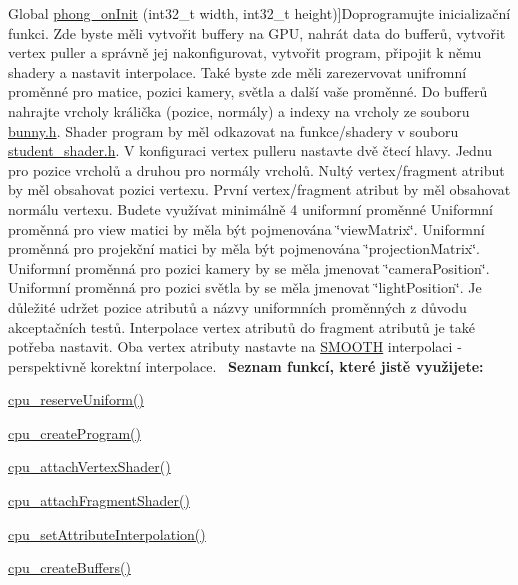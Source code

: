 \begin{DoxyRefList}
Global \hyperlink{group__cpu__side_gac2adb2ba4e748239b9db4d037584d3cc}{phong\+\_\+on\+Init} (int32\+\_\+t width, int32\+\_\+t height)]Doprogramujte inicializační funkci. Zde byste měli vytvořit buffery na G\+PU, nahrát data do bufferů, vytvořit vertex puller a správně jej nakonfigurovat, vytvořit program, připojit k němu shadery a nastavit interpolace. Také byste zde měli zarezervovat unifromní proměnné pro matice, pozici kamery, světla a další vaše proměnné. Do bufferů nahrajte vrcholy králička (pozice, normály) a indexy na vrcholy ze souboru \hyperlink{bunny_8h}{bunny.\+h}. Shader program by měl odkazovat na funkce/shadery v souboru \hyperlink{student__shader_8h}{student\+\_\+shader.\+h}. V konfiguraci vertex pulleru nastavte dvě čtecí hlavy. Jednu pro pozice vrcholů a druhou pro normály vrcholů. Nultý vertex/fragment atribut by měl obsahovat pozici vertexu. První vertex/fragment atribut by měl obsahovat normálu vertexu. Budete využívat minimálně 4 uniformní proměnné Uniformní proměnná pro view matici by měla být pojmenována \char`\"{}view\+Matrix\char`\"{}. Uniformní proměnná pro projekční matici by měla být pojmenována \char`\"{}projection\+Matrix\char`\"{}. Uniformní proměnná pro pozici kamery by se měla jmenovat \char`\"{}camera\+Position\char`\"{}. Uniformní proměnná pro pozici světla by se měla jmenovat \char`\"{}light\+Position\char`\"{}. Je důležité udržet pozice atributů a názvy uniformních proměnných z důvodu akceptačních testů. Interpolace vertex atributů do fragment atributů je také potřeba nastavit. Oba vertex atributy nastavte na \hyperlink{program_8h_a8472f01c511d77bbfb981a46618ea1eaa33c7ccbb848d8fd75455dd9786a1153a}{S\+M\+O\+O\+TH} interpolaci -\/ perspektivně korektní interpolace.~\newline
 {\bfseries Seznam funkcí, které jistě využijete\+:}
\begin{DoxyItemize}
\item \hyperlink{uniforms_8h_acd308bcb7720918cb48f75292a247dfb}{cpu\+\_\+reserve\+Uniform()}
\item \hyperlink{program_8h_a4fca7a0e3dac7f93620a1bde6efcde16}{cpu\+\_\+create\+Program()}
\item \hyperlink{program_8h_aaefc7833a6deea461cc06d00318f7975}{cpu\+\_\+attach\+Vertex\+Shader()}
\item \hyperlink{program_8h_a402ad69a9f1b80b8de408b991e190ed6}{cpu\+\_\+attach\+Fragment\+Shader()}
\item \hyperlink{program_8h_aca1c5019ec58c919160c4c12a5e5fa06}{cpu\+\_\+set\+Attribute\+Interpolation()}
\item \hyperlink{buffer_8h_a6ba9c58dc4b7bc81e83d3dae3c6b292f}{cpu\+\_\+create\+Buffers()}

\end{DoxyItemize}
\end{DoxyRefList}
